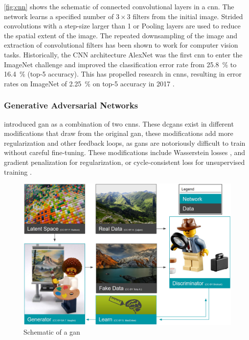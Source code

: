 \cref{fig:cnn} shows the schematic of connected convolutional layers in a \ac{cnn}. The network learns a specified number of $3\times3$ filters from the initial image. Strided convolutions with a step-size larger than 1 or Pooling layers are used to reduce the spatial extent of the image. The repeated downsampling of the image and extraction of convolutional filters has been shown to work for computer vision tasks. Historically, the CNN architecture AlexNet \citep{krizhevsky2012imagenet} was the first \ac{cnn} to enter the ImageNet challenge and improved the classification error rate from 25.8~\% to 16.4~\% (top-5 accuracy). This has propelled research in \acp{cnn}, resulting in error rates on ImageNet of 2.25~\% on top-5 accuracy in 2017 \citep{imagenetresults}.

\subsubsection{Generative Adversarial Networks}
\citet{Goodfellow2014-ax} introduced \acf{gan} as a combination of two \acp{cnn}. These \acfp{dcgan} exist in different modifications that draw from the original \ac{gan}, these modifications add more regularization and other feedback loops, as \acp{gan} are notoriously difficult to train without careful fine-tuning. These modifications include Wasserstein losses \citep{arjovsky2017wasserstein}, and gradient penalization \citep{gulrajani2017improved} for regularization, or cycle-consistent loss for unsupervised training \citep{zhu2017unpaired}.

\begin{figure}
    \centering
    \includegraphics[width=\textwidth]{figures/GAN.PNG}
    \caption{Schematic of a \acl{gan}}
    \label{fig:gan}
\end{figure}

